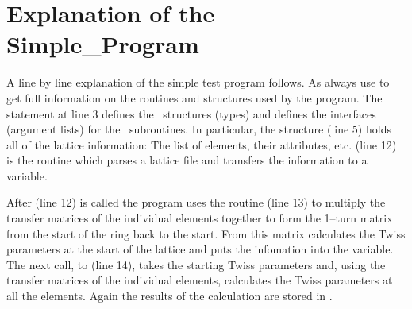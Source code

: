 \section{Explanation of the Simple\_Program}

A line by line explanation of the simple test program follows.  As
always use  to get full information on the routines and
structures used by the program. The  statement at line 3
defines the \bmad\ structures (types) and defines the interfaces
(argument lists) for the \bmad\ subroutines. In particular, the
 structure (line 5) holds all of the lattice
information: The list of elements, their attributes,
etc.  (line 12) is the routine which parses a lattice
file and transfers the information to a
 variable.

After  (line 12) is called the program uses the
routine  (line 13) to multiply the transfer
matrices of the individual elements together to form the 1--turn
matrix from the start of the ring back to the start. From this matrix
 calculates the Twiss parameters at the start of
the lattice and puts the infomation into the  variable. The
next call, to  (line 14), takes the starting
Twiss parameters and, using the transfer matrices of the individual
elements, calculates the Twiss parameters at all the elements. Again
the results of the calculation are stored in . 

